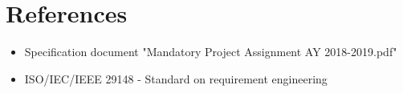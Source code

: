 \chapter{References}

\begin{itemize}
\item Specification document "Mandatory Project Assignment AY 2018-2019.pdf"
\item ISO/IEC/IEEE 29148 - Standard on requirement engineering
\end{itemize}